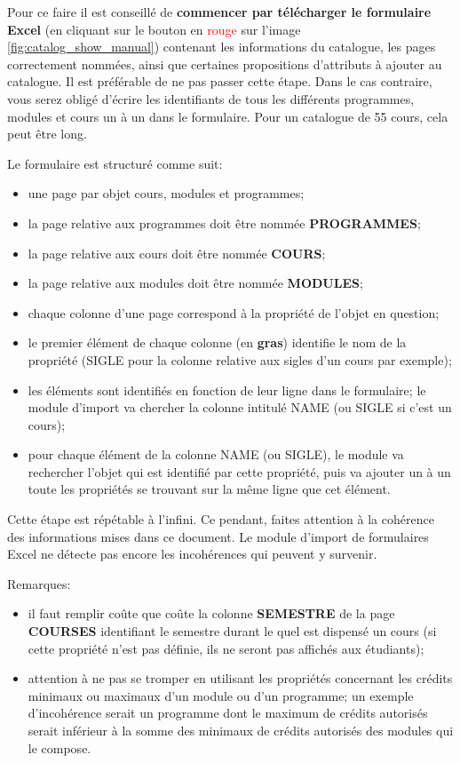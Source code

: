 Pour ce faire il est conseillé  de \textbf{commencer par télécharger le formulaire Excel} (en cliquant sur le bouton en \textcolor{red}{rouge} sur l'image \ref{fig:catalog_show_manual}) contenant les informations du catalogue, les pages correctement nommées, ainsi que certaines propositions d'attributs à ajouter au catalogue. Il est préférable de ne pas passer cette étape. Dans le cas contraire, vous serez obligé d'écrire les identifiants de tous les différents programmes, modules et cours un à un dans le formulaire. Pour un catalogue de 55 cours, cela peut être long. 

Le formulaire est structuré comme suit:
\begin{itemize}
\item une page par objet cours, modules et programmes;
\item la page relative aux programmes doit être nommée \textbf{PROGRAMMES};
\item la page relative aux cours doit être nommée \textbf{COURS};
\item la page relative aux modules doit être nommée \textbf{MODULES};
\item chaque colonne d'une page correspond à la propriété de l'objet en question;
\item le premier élément de chaque colonne (en \textbf{gras}) identifie le nom de la propriété (SIGLE pour la colonne relative aux sigles d'un cours par exemple);
\item les éléments sont identifiés en fonction de leur ligne dans le formulaire; le module d'import va chercher la colonne intitulé NAME (ou SIGLE si c'est un cours);
\item pour chaque élément de la colonne NAME (ou SIGLE), le module va rechercher l'objet qui est identifié par cette propriété, puis va ajouter un à un toute les propriétés se trouvant sur la même ligne que cet élément. 
\end{itemize}

Cette étape est répétable à l’infini. Ce pendant, faites attention à la cohérence des informations mises dans ce document. Le module d'import de formulaires Excel ne détecte pas encore les incohérences qui peuvent y survenir. 

Remarques:
\begin{itemize}
\item il faut remplir coûte que coûte la colonne \textbf{SEMESTRE} de la page \textbf{COURSES} identifiant le semestre durant le quel est dispensé un cours (si cette propriété n'est pas définie, ils ne seront pas affichés aux étudiants);
\item attention à ne pas se tromper en utilisant les propriétés concernant les crédits minimaux ou maximaux d'un module ou d'un programme; un exemple d'incohérence serait un programme dont le maximum de crédits autorisés serait inférieur à la somme des minimaux de crédits autorisés des modules qui le compose.
\end{itemize}



